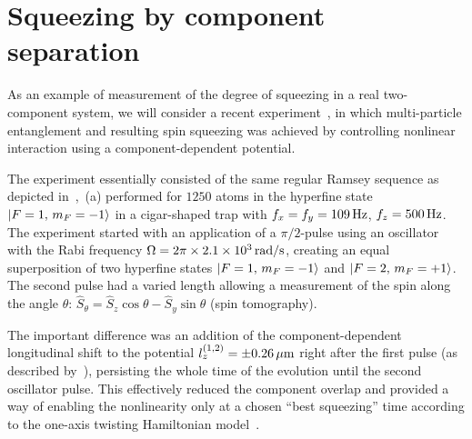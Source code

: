 \section{Squeezing by component separation}
\label{sec:bec-squeezing:separation}

As an example of measurement of the degree of squeezing in a real two-component  system, we will consider a recent experiment~\cite{Riedel2010}, in which multi-particle entanglement and resulting spin squeezing was achieved by controlling nonlinear interaction using a component-dependent potential.

The experiment essentially consisted of the same regular Ramsey sequence as depicted in~,~(a) performed for $1250$ \Rb{} atoms in the hyperfine state ${\mbox{\ensuremath{\left\vert F=1,\, m_F=-1 \right\rangle}}}$ in a cigar-shaped trap with $f_x = f_y = 109\mbox{\ensuremath{\,\mathrm{Hz}}}$, $f_z = 500\mbox{\ensuremath{\,\mathrm{Hz}}}$.
The experiment started with an application of a $\pi/2$-pulse using an oscillator with the Rabi frequency $\Omega=2\pi \times 2.1\times 10^{3}\mbox{\ensuremath{\,\mathrm{rad/s}}}$, creating an equal superposition of two hyperfine states ${\mbox{\ensuremath{\left\vert F=1,\, m_F=-1 \right\rangle}}}$ and ${\mbox{\ensuremath{\left\vert F=2,\, m_F=+1 \right\rangle}}}$.
The second pulse had a varied length allowing a measurement of the spin along the angle $\theta$: $\hat{S}_\theta = \hat{S}_z \cos \theta - \hat{S}_y \sin \theta$ (spin tomography).

The important difference was an addition of the component-dependent longitudinal shift to the potential $l_z^{(1,2)} = \pm 0.26\mbox{\ensuremath{\,\mathrm{\mu m}}}$ right after the first pulse (as described by~), persisting the whole time of the evolution until the second oscillator pulse.
This effectively reduced the component overlap and provided a way of enabling the nonlinearity only at a chosen ``best squeezing'' time according to the one-axis twisting Hamiltonian model~\cite{Kitagawa1993}.

